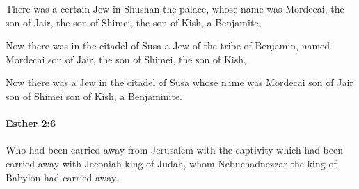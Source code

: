 			\begin{versebox}
					\item[BHS] 
					\item[LXX] 
					\item[ASV] There was a certain Jew in Shushan the palace, whose name was Mordecai, the son of Jair, the son of Shimei, the son of Kish, a Benjamite,
					\item[NIV] Now there was in the citadel of Susa a Jew of the tribe of Benjamin, named Mordecai son of Jair, the son of Shimei, the son of Kish,
					\item[NRSV] Now there was a Jew in the citadel of Susa whose name was Mordecai son of Jair son of Shimei son of Kish, a Benjaminite.
			\end{versebox}

		\paragraph{Esther 2:6} %
			\label{ESTHER-2-6}

			Who had been carried away from Jerusalem with the captivity which had been carried away with Jeconiah king of Judah, whom Nebuchadnezzar the king of Babylon had carried away.

